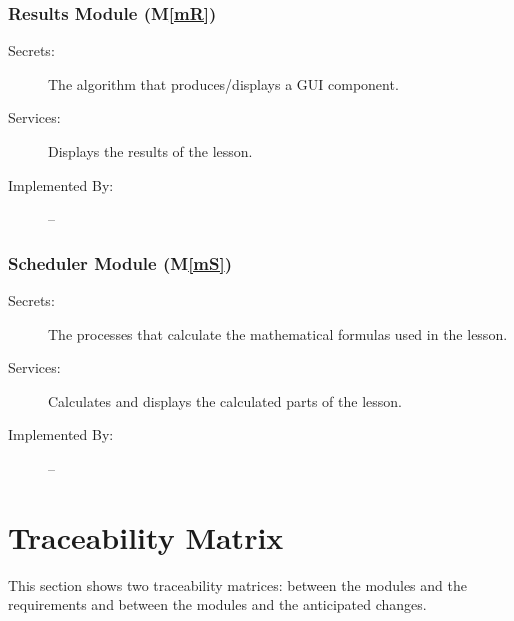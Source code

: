 \documentclass[12pt, titlepage]{article}
\newcommand{\mref}[1]{M\ref{#1}}
\begin{document}
\subsubsection{Results Module (\mref{mR})}

\begin{description}
\item[Secrets:] The algorithm that produces/displays a GUI component.
\item[Services:] Displays the results of the lesson.
\item[Implemented By:] --
\end{description}


\subsubsection{Scheduler Module (\mref{mS})}

\begin{description}
\item[Secrets:] The processes that calculate the mathematical formulas used in the lesson.
\item[Services:] Calculates and displays the calculated parts of the lesson.
\item[Implemented By:] --
\end{description}


\section{Traceability Matrix} \label{SecTM}

This section shows two traceability matrices: between the modules and the
requirements and between the modules and the anticipated changes.
\end{document}
